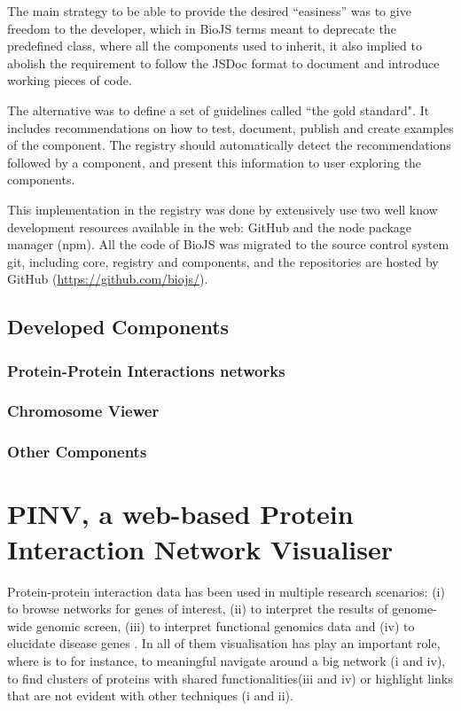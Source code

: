 The main strategy to be able to provide the desired ``easiness'' was to give freedom to the developer, which in BioJS terms meant to deprecate the predefined class, where all the components used to inherit, it also implied to abolish the requirement to follow the JSDoc format to document and introduce working pieces of code.

The alternative was to define a set of guidelines called ``the gold standard". It includes recommendations on how to test, document, publish and create examples of the component. The registry should automatically detect the recommendations followed by a component, and present this information to user exploring the components.

This implementation in the registry was done by extensively use two well know development resources available in the web: GitHub and the node package manager (npm). All the code of BioJS was migrated to the source control system git, including core, registry and components, and the repositories are hosted by GitHub (\url{https://github.com/biojs/}).

\subsection{Developed Components} \label{subsec:biojs_components}
\subsubsection{Protein-Protein Interactions networks} \label{subsubsec:ppi_biojs}
\subsubsection{Chromosome Viewer}
\subsubsection{Other Components}

\section{PINV, a web-based Protein Interaction Network Visualiser }  \label{section:pinv}
Protein-protein interaction data has been used in multiple research scenarios: (i) to browse networks for genes of interest, (ii) to interpret the results of genome-wide genomic screen, (iii) to interpret functional genomics data and (iv) to elucidate disease genes \cite{FRA2013}. In all of them visualisation has play an important role, where is to for instance,  to meaningful navigate around a big network (i and iv), to find clusters of proteins with shared functionalities(iii and iv)  or highlight links that are not evident with other techniques (i and ii).

